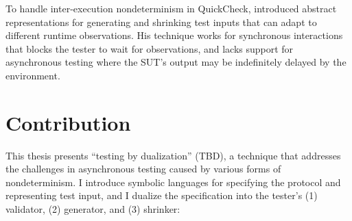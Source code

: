 To handle inter-execution nondeterminism in QuickCheck, \citet{Hughes2016}
introduced abstract representations for generating and shrinking test inputs
that can adapt to different runtime observations.  His technique works for
synchronous interactions that blocks the tester to wait for observations, and
lacks support for asynchronous testing where the SUT's output may be
indefinitely delayed by the environment.

\section{Contribution}
\label{sec:contribution}
This thesis presents ``testing by dualization'' (TBD), a technique that
addresses the challenges in asynchronous testing caused by various forms of
nondeterminism.  I introduce symbolic languages for specifying the protocol and
representing test input, and I dualize the specification into the tester's (1)
validator, (2) generator, and (3) shrinker:

